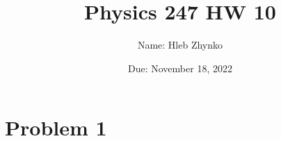 \documentclass{article}
\title{Physics 247 HW 10}
\author{Name: Hleb Zhynko}
\date{Due: November 18, 2022}
\begin{document}
\maketitle

\section*{Problem 1}
\end{document}
